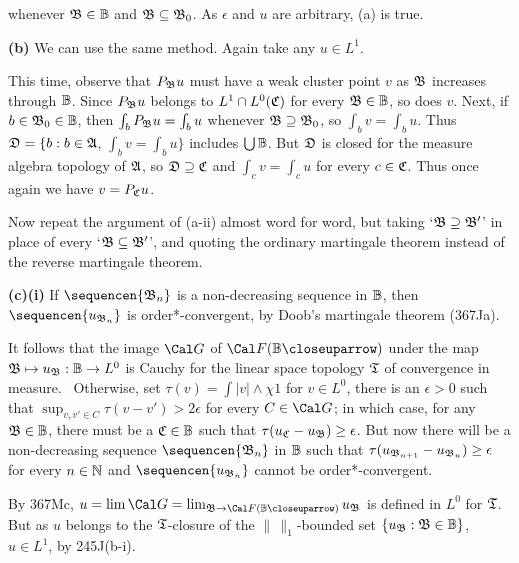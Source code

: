 {\noindent whenever $\frak B\in\Bbb B$ and $\frak B\subseteq\frak B_0$.
As $\epsilon$ and $u$ are arbitrary, (a) is true.

\medskip

{\bf (b)} We can use the same method.   Again take any $u\in L^1$.

\medskip

 This time, observe that $P_{\frak B}u$ must have a weak
cluster point $v$ as $\frak B$ increases through $\Bbb B$.   Since
$P_{\frak B}u$ belongs to $L^1\cap L^0(\frak C)$ for every 
$\frak B\in\Bbb B$, so does $v$.   Next, if $b\in\frak B_0\in\Bbb B$, then
$\int_bP_{\frak B}u=\int_bu$ whenever $\frak B\supseteq\frak B_0$, so
$\int_bv=\int_bu$.   Thus $\frak D=\{b:b\in\frak A$, $\int_bv=\int_bu\}$ 
includes $\bigcup\Bbb B$.   But $\frak D$ is closed for the measure algebra
topology of $\frak A$, so $\frak D\supseteq\frak C$ and $\int_cv=\int_cu$
for every $c\in\frak C$.   Thus once again we have $v=P_{\frak C}u$.

\medskip

 Now repeat the argument of (a-ii) almost word for word, but
taking `$\frak B\supseteq\frak B'$' in place of every 
`$\frak B\subseteq\frak B'$', and quoting the ordinary martingale theorem
instead of the reverse martingale theorem.

\medskip

{\bf (c)(i)} If $\sequencen{\frak B_n}$ is a non-decreasing sequence in
$\Bbb B$, then $\sequencen{u_{\frak B_n}}$ is order*-convergent, by
Doob's martingale theorem (367Ja).   

\medskip

It follows that the image $\Cal G$ of $\Cal F(\Bbb B\closeuparrow)$
under the map $\frak B\mapsto u_{\frak B}:\Bbb B\to L^0$ is
Cauchy for the linear space topology $\frak T$ of convergence in measure.
\Prf\Quer\ Otherwise, set $\tau(v)=\int|v|\wedge\chi 1$ for $v\in L^0$,
there is an $\epsilon>0$ such that $\sup_{v,v'\in C}\tau(v-v')>2\epsilon$
for every $C\in\Cal G$;  in which case, for any $\frak B\in\Bbb B$, there
must be a $\frak C\in\Bbb B$ such that 
$\tau(u_{\frak C}-u_{\frak B})\ge\epsilon$.   But now there will be a
non-decreasing sequence $\sequencen{\frak B_n}$ in $\Bbb B$ such that
$\tau(u_{\frak B_{n+1}}-u_{\frak B_n})\ge\epsilon$ for every $n\in\Bbb N$
and $\sequencen{u_{\frak B_n}}$ cannot be order*-convergent.\ \Bang\Qed

\medskip

 By 367Mc,
$u=\lim\Cal G=\lim_{\frak B\to\Cal F(\Bbb B\closeuparrow)}u_{\frak B}$
is defined in $L^0$ for $\frak T$.   But as $u$ belongs to the
$\frak T$-closure of the $\|\,\|_1$-bounded set 
$\{u_{\frak B}:\frak B\in\Bbb B\}$, $u\in L^1$, by 245J(b-i).
}%


